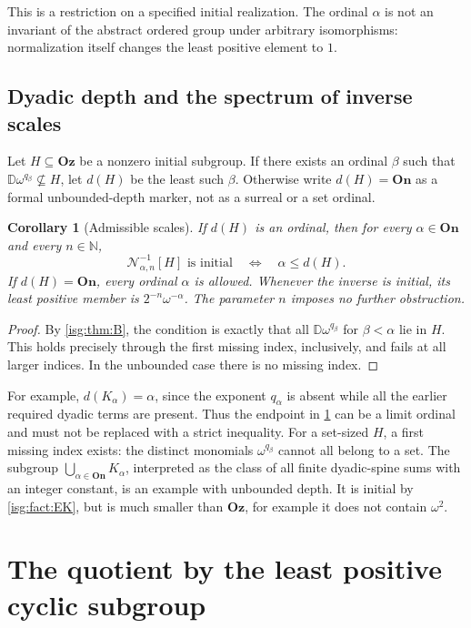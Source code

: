 \documentclass[11pt]{article}
\newtheorem{corollary}[corollary]{Corollary}
\theoremstyle{definition}
\theoremstyle{remark}
\newcommand{\Oz}{\ensuremath{\mathbf{Oz}}}
\newcommand{\On}{\ensuremath{\mathbf{On}}}
\newcommand{\N}{\mathbb{N}}
\newcommand{\D}{\mathbb{D}}
\newcommand{\Rect}{\mathcal{N}_{\alpha,n}}
\begin{document}
This is a restriction on a specified initial realization. The ordinal
$\alpha$ is not an invariant of the abstract ordered group under arbitrary
isomorphisms: normalization itself changes the least positive element
to $1$.

\subsection{Dyadic depth and the spectrum of inverse scales}
\begin{definition}\label{isg:def:depth}
Let $H\subseteq\Oz$ be a nonzero initial subgroup. If there exists an
ordinal $\beta$ such that $\D\omega^{q_\beta}\not\subseteq H$, let
$d(H)$ be the least such $\beta$. Otherwise write $d(H)=\On$ as a
formal unbounded-depth marker, not as a surreal or a set ordinal.
\end{definition}

\begin{corollary}[Admissible scales]\label{isg:cor:depth}
If $d(H)$ is an ordinal, then for every $\alpha\in\On$ and every
$n\in\N$,
\[
 \Rect^{-1}[H]\text{ is initial}
 \quad\Longleftrightarrow\quad \alpha\le d(H).
\]
If $d(H)=\On$, every ordinal $\alpha$ is allowed. Whenever the inverse
is initial, its least positive member is $2^{-n}\omega^{-\alpha}$.
The parameter $n$ imposes no further obstruction.
\end{corollary}
\begin{proof}
By \cref{isg:thm:B}, the condition is exactly that all
$\D\omega^{q_\beta}$ for $\beta<\alpha$ lie in $H$. This holds
precisely through the first missing index, inclusively, and fails at all
larger indices. In the unbounded case there is no missing index.
\end{proof}

For example, $d(K_\alpha)=\alpha$, since the exponent $q_\alpha$
is absent while all the earlier required dyadic terms are present.
Thus the endpoint in \cref{isg:cor:depth} can be a limit ordinal and must
not be replaced with a strict inequality. For a set-sized $H$, a first
missing index exists: the distinct monomials $\omega^{q_\beta}$
cannot all belong to a set. The subgroup
$\bigcup_{\alpha\in\On}K_\alpha$, interpreted as the class of all
finite dyadic-spine sums with an integer constant, is an example with
unbounded depth. It is initial by \cref{isg:fact:EK}, but is much smaller
than $\Oz$, for example it does not contain $\omega^2$.

\section{The quotient by the least positive cyclic subgroup}\label{isg:sec:quotient}
\end{document}
